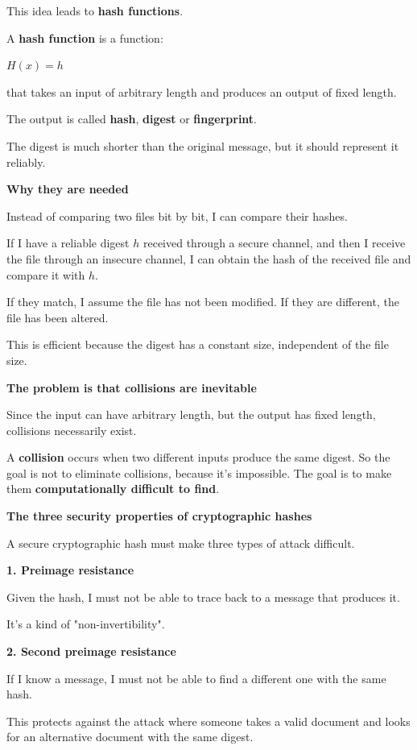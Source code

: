 \documentclass{article}
\begin{document}
This idea leads to \textbf{hash functions}.

A \textbf{hash function} is a function:

$H(x)=h$

that takes an input of arbitrary length and produces an output of fixed length.

The output is called \textbf{hash}, \textbf{digest} or \textbf{fingerprint}.

The digest is much shorter than the original message, but it should represent it reliably.

\textbf{Why they are needed}

Instead of comparing two files bit by bit, I can compare their hashes.

If I have a reliable digest $h$ received through a secure channel, and then I receive the file through an insecure channel, I can obtain the hash of the received file and compare it with $h$.

If they match, I assume the file has not been modified. If they are different, the file has been altered.

This is efficient because the digest has a constant size, independent of the file size.

\textbf{The problem is that collisions are inevitable}

Since the input can have arbitrary length, but the output has fixed length, collisions necessarily exist.

A \textbf{collision} occurs when two different inputs produce the same digest. So the goal is not to eliminate collisions, because it's impossible. The goal is to make them \textbf{computationally difficult to find}.

\textbf{The three security properties of cryptographic hashes}

A secure cryptographic hash must make three types of attack difficult.

\textbf{1. Preimage resistance}

Given the hash, I must not be able to trace back to a message that produces it.

It's a kind of "non-invertibility".

\textbf{2. Second preimage resistance}

If I know a message, I must not be able to find a different one with the same hash.

This protects against the attack where someone takes a valid document and looks for an alternative document with the same digest.
\end{document}
